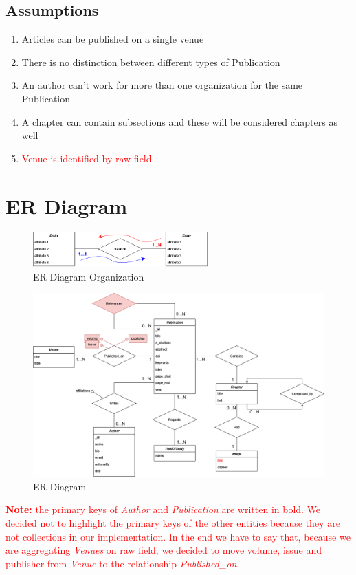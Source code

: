 \documentclass{Configuration_Files/PoliMi3i_thesis}
\begin{document}
\section{Assumptions}
\label{sec:assumptions}
\begin{enumerate}
\item Articles can be published on a single venue
\item There is no distinction between different types of Publication
\item An author can't work for more than one organization for the same Publication
\item A chapter can contain subsections and these will be considered chapters as well
\item \textcolor{red}{Venue is identified by raw field}
\end{enumerate}

\chapter{ER Diagram}
\label{ch:erd}
\begin{figure}[H]
	\centering
	\includegraphics[width=0.6\textwidth]{legendaER.png}
	\caption{ER Diagram Organization}
	\label{fig:erleg}
\end{figure}
\bigskip
\begin{figure}[H]
	\centering
	\includegraphics[width=1\textwidth]{ERDocDb.png}
	\caption{ER Diagram}
	\label{fig:er}
\end{figure}
\textcolor{red}{\textbf{Note:} the primary keys of \emph{Author} and \emph{Publication} are written in bold. We decided
not to highlight the primary keys of the other entities because they are not collections in our implementation.\newline
In the end we have to say that, because we are aggregating \emph{Venues} on raw field, we decided to move volume,
issue and publisher from \emph{Venue} to the relationship \emph{Published\_on}.}
\end{document}
